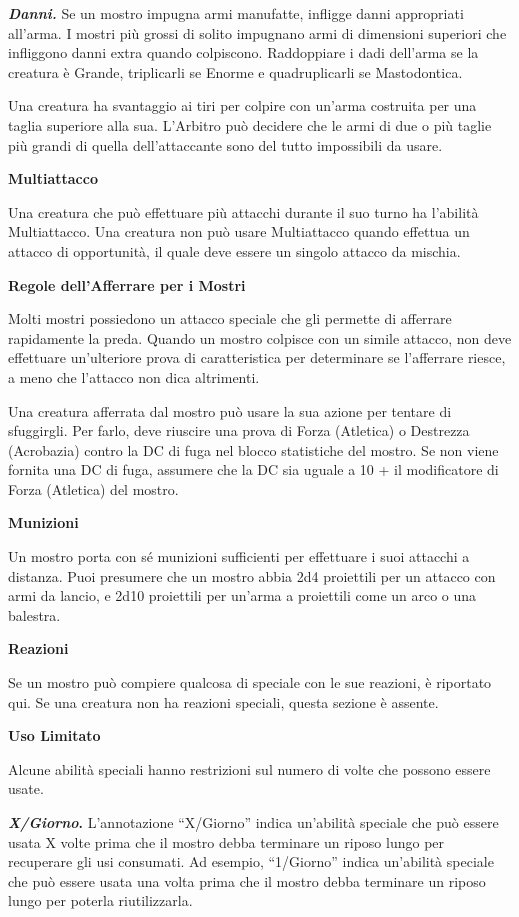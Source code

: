 \begin{multicols}{2}
\emph{\textbf{Danni.}} Se un mostro impugna armi manufatte, infligge
danni appropriati all'arma. I mostri più grossi di solito impugnano armi
di dimensioni superiori che infliggono danni extra quando colpiscono.
Raddoppiare i dadi dell'arma se la creatura è Grande, triplicarli se
Enorme e quadruplicarli se Mastodontica.

Una creatura ha svantaggio ai tiri per colpire con un'arma costruita per
una taglia superiore alla sua. L'Arbitro può decidere che le armi di due
o più taglie più grandi di quella dell'attaccante sono del tutto
impossibili da usare.

\textbf{Multiattacco}

Una creatura che può effettuare più attacchi durante il suo turno ha
l'abilità Multiattacco. Una creatura non può usare Multiattacco quando
effettua un attacco di opportunità, il quale deve essere un singolo
attacco da mischia.

\textbf{Regole dell'Afferrare per i Mostri}

Molti mostri possiedono un attacco speciale che gli permette di
afferrare rapidamente la preda. Quando un mostro colpisce con un simile
attacco, non deve effettuare un'ulteriore prova di caratteristica per
determinare se l'afferrare riesce, a meno che l'attacco non dica
altrimenti.

Una creatura afferrata dal mostro può usare la sua azione per tentare di
sfuggirgli. Per farlo, deve riuscire una prova di Forza (Atletica) o
Destrezza (Acrobazia) contro la DC di fuga nel blocco statistiche del
mostro. Se non viene fornita una DC di fuga, assumere che la DC sia
uguale a 10 + il modificatore di Forza (Atletica) del mostro.

\textbf{Munizioni}

Un mostro porta con sé munizioni sufficienti per effettuare i suoi
attacchi a distanza. Puoi presumere che un mostro abbia 2d4 proiettili
per un attacco con armi da lancio, e 2d10 proiettili per un'arma a
proiettili come un arco o una balestra.

\textbf{Reazioni}

Se un mostro può compiere qualcosa di speciale con le sue reazioni, è
riportato qui. Se una creatura non ha reazioni speciali, questa sezione
è assente.

\textbf{Uso Limitato}

Alcune abilità speciali hanno restrizioni sul numero di volte che
possono essere usate.

\textbf{\emph{X/Giorno}.} L'annotazione ``X/Giorno'' indica un'abilità
speciale che può essere usata X volte prima che il mostro debba
terminare un riposo lungo per recuperare gli usi consumati. Ad esempio,
``1/Giorno'' indica un'abilità speciale che può essere usata una volta
prima che il mostro debba terminare un riposo lungo per poterla
riutilizzarla.


\end{multicols}
